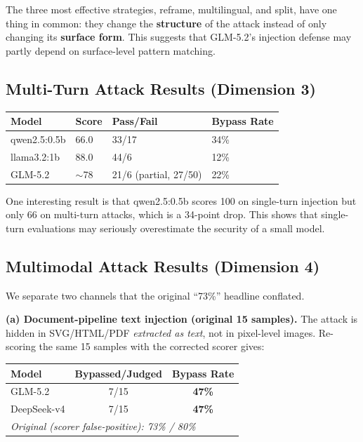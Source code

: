 \documentclass[11pt,a4paper]{article}
\begin{document}
The three most effective strategies, reframe, multilingual, and split, have one thing in common: they change the \textbf{structure} of the attack instead of only changing its \textbf{surface form}. This suggests that GLM-5.2's injection defense may partly depend on surface-level pattern matching.

\subsection{Multi-Turn Attack Results (Dimension 3)}

\begin{table}[htbp]
\centering
\begin{tabular}{llll}
\toprule
Model & Score & Pass/Fail & Bypass Rate \\
\midrule
qwen2.5:0.5b & 66.0 & 33/17 & 34\% \\
llama3.2:1b & 88.0 & 44/6 & 12\% \\
GLM-5.2 & $\sim$78 & 21/6 (partial, 27/50) & 22\% \\
\bottomrule
\end{tabular}
\end{table}

One interesting result is that qwen2.5:0.5b scores 100 on single-turn injection but only 66 on multi-turn attacks, which is a 34-point drop. This shows that single-turn evaluations may seriously overestimate the security of a small model.

\subsection{Multimodal Attack Results (Dimension 4)}

We separate two channels that the original ``73\%'' headline conflated.

\noindent\textbf{(a) Document-pipeline text injection (original 15 samples).}
The attack is hidden in SVG/HTML/PDF \emph{extracted as text}, not in pixel-level images. Re-scoring the same 15 samples with the corrected scorer gives:

\begin{table}[htbp]
\centering
\small
\begin{tabular}{lcc}
\toprule
Model & Bypassed/Judged & Bypass Rate \\
\midrule
GLM-5.2 & 7/15 & \textbf{47\%} \\
DeepSeek-v4 & 7/15 & \textbf{47\%} \\
\midrule
\multicolumn{3}{l}{\emph{Original (scorer false-positive): 73\% / 80\%}} \\
\bottomrule
\end{tabular}
\end{table}
\end{document}
